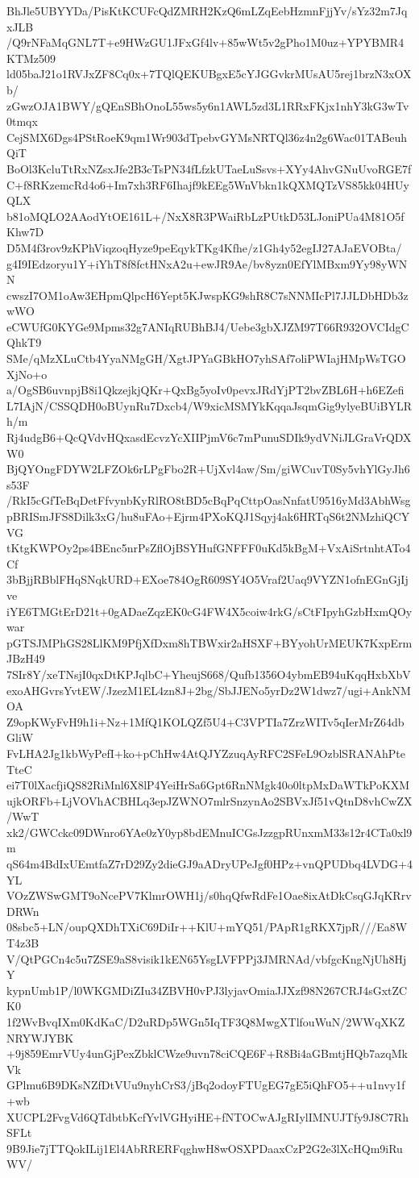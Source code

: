 BhJle5UBYYDa/PisKtKCUFcQdZMRH2KzQ6mLZqEebHzmnFjjYv/sYz32m7JqxJLB
/Q9rNFaMqGNL7T+e9HWzGU1JFxGf4lv+85wWt5v2gPho1M0uz+YPYBMR4KTMz509
ld05baJ21o1RVJxZF8Cq0x+7TQlQEKUBgxE5cYJGGvkrMUsAU5rej1brzN3xOXb/
zGwzOJA1BWY/gQEnSBhOnoL55ws5y6n1AWL5zd3L1RRxFKjx1nhY3kG3wTv0tmqx
CejSMX6Dgs4PStRoeK9qm1Wr903dTpebvGYMsNRTQl36z4n2g6Wac01TABeuhQiT
BoOl3KcluTtRxNZsxJfe2B3cTsPN34fLfzkUTaeLuSsvs+XYy4AhvGNuUvoRGE7f
C+f8RKzemcRd4o6+Im7xh3RF6Ihajf9kEEg5WnVbkn1kQXMQTzVS85kk04HUyQLX
b81oMQLO2AAodYtOE161L+/NxX8R3PWaiRbLzPUtkD53LJoniPUa4M81O5fKhw7D
D5M4f3rov9zKPhViqzoqHyze9peEqykTKg4Kfhe/z1Gh4y52egIJ27AJaEVOBta/
g4I9IEdzoryu1Y+iYhT8f8fctHNxA2u+ewJR9Ae/bv8yzn0EfYlMBxm9Yy98yWNN
cwszI7OM1oAw3EHpmQlpcH6Yept5KJwspKG9shR8C7sNNMIcPl7JJLDbHDb3zwWO
eCWUfG0KYGe9Mpms32g7ANIqRUBhBJ4/Uebe3gbXJZM97T66R932OVCIdgCQhkT9
SMe/qMzXLuCtb4YyaNMgGH/XgtJPYaGBkHO7yhSAf7oliPWIajHMpWsTGOXjNo+o
a/OgSB6uvnpjB8i1QkzejkjQKr+QxBg5yoIv0pevxJRdYjPT2bvZBL6H+h6EZefi
L7IAjN/CSSQDH0oBUynRu7Dxcb4/W9xicMSMYkKqqaJsqmGig9ylyeBUiBYLRh/m
Rj4udgB6+QcQVdvHQxasdEcvzYcXIIPjmV6c7mPunuSDIk9ydVNiJLGraVrQDXW0
BjQYOngFDYW2LFZOk6rLPgFbo2R+UjXvl4aw/Sm/giWCuvT0Sy5vhYlGyJh6s53F
/RkI5cGfTeBqDetFfvynbKyRlRO8tBD5cBqPqCttpOasNnfatU9516yMd3AbhWsg
pBRISmJFS8Dilk3xG/hu8uFAo+Ejrm4PXoKQJ1Sqyj4ak6HRTqS6t2NMzhiQCYVG
tKtgKWPOy2ps4BEnc5nrPsZflOjBSYHufGNFFF0uKd5kBgM+VxAiSrtnhtATo4Cf
3bBjjRBblFHqSNqkURD+EXoe784OgR609SY4O5Vraf2Uaq9VYZN1ofnEGnGjIjve
iYE6TMGtErD21t+0gADaeZqzEK0cG4FW4X5coiw4rkG/sCtFIpyhGzbHxmQOywar
pGTSJMPhGS28LlKM9PfjXfDxm8hTBWxir2aHSXF+BYyohUrMEUK7KxpErmJBzH49
7SIr8Y/xeTNsjI0qxDtKPJqlbC+YheujS668/Qufb1356O4ybmEB94uKqqHxbXbV
exoAHGvrsYvtEW/JzezM1EL4zn8J+2bg/SbJJENo5yrDz2W1dwz7/ugi+AnkNMOA
Z9opKWyFvH9h1i+Nz+1MfQ1KOLQZf5U4+C3VPTIa7ZrzWITv5qIerMrZ64dbGliW
FvLHA2Jg1kbWyPefI+ko+pChHw4AtQJYZzuqAyRFC2SFeL9OzblSRANAhPteTteC
ei7T0lXacfjiQS82RiMnl6X8lP4YeiHrSa6Gpt6RnNMgk40o0ltpMxDaWTkPoKXM
ujkORFb+LjVOVhACBHLq3epJZWNO7mlrSnzynAo2SBVxJf51vQtnD8vhCwZX/WwT
xk2/GWCckc09DWnro6YAe0zY0yp8bdEMnuICGsJzzgpRUnxmM33s12r4CTa0xl9m
qS64m4BdIxUEmtfaZ7rD29Zy2dieGJ9aADryUPeJgf0HPz+vnQPUDbq4LVDG+4YL
VOzZWSwGMT9oNcePV7KlmrOWH1j/s0hqQfwRdFe1Oae8ixAtDkCsqGJqKRrvDRWn
08sbc5+LN/oupQXDhTXiC69DiIr++KlU+mYQ51/PApR1gRKX7jpR///Ea8WT4z3B
V/QtPGCn4c5u7ZSE9aS8visik1kEN65YsgLVFPPj3JMRNAd/vbfgcKngNjUh8HjY
kypnUmb1P/l0WKGMDiZIu34ZBVH0vPJ3lyjavOmiaJJXzf98N267CRJ4sGxtZCK0
1f2WvBvqIXm0KdKaC/D2uRDp5WGn5IqTF3Q8MwgXTlfouWuN/2WWqXKZNRYWJYBK
+9j859EmrVUy4unGjPexZbklCWze9uvn78ciCQE6F+R8Bi4aGBmtjHQb7azqMkVk
GPlmu6B9DKsNZfDtVUu9nyhCrS3/jBq2odoyFTUgEG7gE5iQhFO5++u1nvy1f+wb
XUCPL2FvgVd6QTdbtbKcfYvlVGHyiHE+fNTOCwAJgRIylIMNUJTfy9J8C7RhSFLt
9B9Jie7jTTQokILij1El4AbRRERFqghwH8wOSXPDaaxCzP2G2e3lXcHQm9iRuWV/
